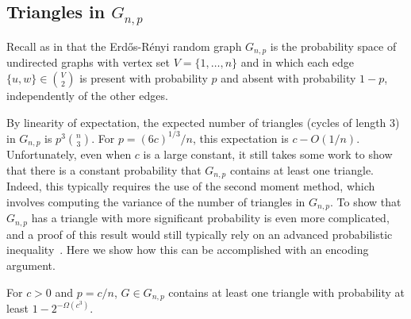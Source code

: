 \documentclass{patmorin}
\newcommand{\aremark}[3]{\textcolor{blue}{\textsc{#1 #2:}}
  \textcolor{red}{\textsf{#3}}}
\newcommand{\tommy}[2][says]{\aremark{Tommy}{#1}{#2}}
\newcommand{\wolfgang}[2][says]{\aremark{Wolfgang}{#1}{#2}}
\begin{document}
\subsection{Triangles in $G_{n,p}$}

Recall as in  that the Erd\H{o}s-R\'{e}nyi random graph
$G_{n,p}$ is the probability space of undirected graphs with vertex set
$V=\{1,\ldots,n\}$ and in which each edge $\{u, w\} \in \binom{V}{2}$
is present with probability $p$ and absent with probability $1-p$,
independently of the other edges.

By linearity of expectation, the expected number of triangles (cycles of length 3) 
in $G_{n,p}$ is $p^3\binom{n}{3}$.  For $p=(6c)^{1/3}/n$, this
expectation is $c-O(1/n)$.  Unfortunately, even when $c$ is a large
constant, it still takes some work to show that there is a constant
probability that $G_{n,p}$ contains at least one triangle. Indeed,
this typically requires the use of the second moment method, which
involves computing the variance of the number of triangles in
$G_{n,p}$. To show that $G_{n, p}$ has a triangle with more
significant probability is even more complicated,
 and a proof of this result would still typically rely on an
advanced probabilistic inequality~\cite{alon:probabilistic}. Here we
show how this can be accomplished with an encoding argument.

\begin{thm}
  For $c > 0$ and $p=c/n$, $G \in G_{n,p}$ contains at least one triangle with
  probability at least $1-2^{-\varOmega(c^3)}$.
\end{thm}
\end{document}
